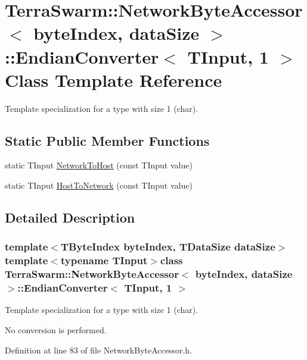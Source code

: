 \hypertarget{class_terra_swarm_1_1_network_byte_accessor_1_1_endian_converter_3_01_t_input_00_011_01_4}{\section{Terra\-Swarm\-:\-:Network\-Byte\-Accessor$<$ byte\-Index, data\-Size $>$\-:\-:Endian\-Converter$<$ T\-Input, 1 $>$ Class Template Reference}
\label{class_terra_swarm_1_1_network_byte_accessor_1_1_endian_converter_3_01_t_input_00_011_01_4}
}


Template specialization for a type with size 1 (char).  


\subsection*{Static Public Member Functions}
\begin{DoxyCompactItemize}
\item 
static T\-Input \hyperlink{class_terra_swarm_1_1_network_byte_accessor_1_1_endian_converter_3_01_t_input_00_011_01_4_ab318817475a64d968cff2871348393fc}{Network\-To\-Host} (const T\-Input value)
\item 
static T\-Input \hyperlink{class_terra_swarm_1_1_network_byte_accessor_1_1_endian_converter_3_01_t_input_00_011_01_4_a92c0e911b07728a12687573586cf040c}{Host\-To\-Network} (const T\-Input value)
\end{DoxyCompactItemize}


\subsection{Detailed Description}
\subsubsection*{template$<$T\-Byte\-Index byte\-Index, T\-Data\-Size data\-Size$>$template$<$typename T\-Input$>$class Terra\-Swarm\-::\-Network\-Byte\-Accessor$<$ byte\-Index, data\-Size $>$\-::\-Endian\-Converter$<$ T\-Input, 1 $>$}

Template specialization for a type with size 1 (char). 

No conversion is performed. 

Definition at line 83 of file Network\-Byte\-Accessor.\-h.




